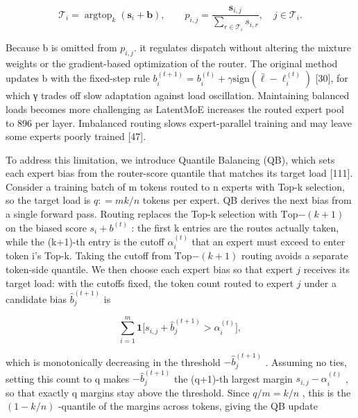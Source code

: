 \documentclass[
  10
]{article}
\begin{document}
\[
\mathcal {T} _ {i} = \operatorname{argtop} _ {k} (\boldsymbol {s} _ {i} + \boldsymbol {b}), \qquad p _ {i, j} = \frac {\boldsymbol {s} _ {i , j}}{\sum_ {r \in \mathcal {T} _ {i}} s _ {i , r}}, \quad j \in \mathcal {T} _ {i}.\tag{13}
\]

Because b is omitted from \(p _ { i , j } .\) it regulates dispatch
without altering the mixture weights or the gradient-based optimization
of the router. The original method updates b with the fixed-step rule
\(b _ { i } ^ { ( t + 1 ) } = b _ { i } ^ { ( t ) } + \gamma \mathrm { s i g n } ( \bar { \ell } - \ell _ { i } ^ { ( t ) } )\)
{[}30{]}, for which γ trades off slow adaptation against load
oscillation. Maintaining balanced loads becomes more challenging as
LatentMoE increases the routed expert pool to 896 per layer. Imbalanced
routing slows expert-parallel training and may leave some experts poorly
trained {[}47{]}.

To address this limitation, we introduce Quantile Balancing (QB), which
sets each expert bias from the router-score quantile that matches its
target load {[}111{]}. Consider a training batch of m tokens routed to n
experts with Top-k selection, so the target load is \(q : = m k / n\)
tokens per expert. QB derives the next bias from a single forward pass.
Routing replaces the Top-k selection with
\(\mathrm { T o p } \mathrm { - } ( k { + } 1 )\) on the biased score
\(s _ { i } + b ^ { ( t ) }\) : the first k entries are the routes
actually taken, while the (k+1)-th entry is the cutoff
\(\alpha _ { i } ^ { ( t ) }\) that an expert must exceed to enter token
i's Top-k. Taking the cutoff from
\(\mathrm { T o p } \mathrm { - } ( k { + } 1 )\) routing avoids a
separate token-side quantile. We then choose each expert bias so that
expert \(j\) receives its target load: with the cutoffs fixed, the token
count routed to expert \(j\) under a candidate bias
\(\widehat { b } _ { j } ^ { ( t + 1 ) }\) is

\[
\sum_ {i = 1} ^ {m} \mathbf {1} \Big [ s _ {i, j} + \widehat {b} _ {j} ^ {(t + 1)} > \alpha_ {i} ^ {(t)} \Big ],
\]

which is monotonically decreasing in the threshold
\(- \widehat { b } _ { j } ^ { ( t + 1 ) }\) . Assuming no ties, setting
this count to q makes \(- \widehat { b } _ { j } ^ { ( t + 1 ) }\) the
(q+1)-th largest margin \(s _ { i , j } - \alpha _ { i } ^ { ( t ) }\) ,
so that exactly q margins stay above the threshold. Since
\(q / m = k / n\) , this is the \(( 1 - k / n )\) -quantile of the
margins across tokens, giving the QB update
\end{document}
